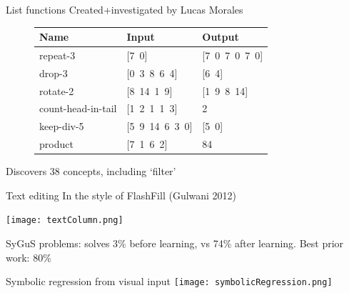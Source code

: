 \documentclass{beamer}
\begin{document}
\begin{frame}{List functions}
  Created+investigated by Lucas Morales


  \vspace{1cm}
  
  \begin{figure}[b]\centering
\vspace{-0.5cm}  \begin{tabular}{lll}
    \toprule
    Name & Input & Output \\\midrule
    repeat-3 & [7\, 0] & [7\, 0\, 7\, 0\, 7\, 0] \\
    drop-3 & [0\, 3\, 8\, 6\, 4] & [6\, 4] \\
    rotate-2 & [8\, 14\, 1\, 9] & [1\, 9\, 8\, 14] \\
    count-head-in-tail & [1\, 2\, 1\, 1\, 3] & 2 \\
    keep-div-5 & [5\, 9\, 14\, 6\, 3\, 0] & [5\, 0] \\
    product & [7\, 1\, 6\, 2] & 84 \\
    \bottomrule
  \end{tabular}
\end{figure}

  Discovers 38 concepts, including `filter'
\end{frame}

\begin{frame}{Text editing}
  In the style of FlashFill (Gulwani 2012)

  \centering  \texttt{[image: textColumn.png]}

  SyGuS problems: solves 3\% before learning, vs 74\% after learning. Best prior work: 80\%

  

  \end{frame}

\begin{frame}{Symbolic regression from visual input}
\centering\texttt{[image: symbolicRegression.png]}
\end{frame}
\end{document}
